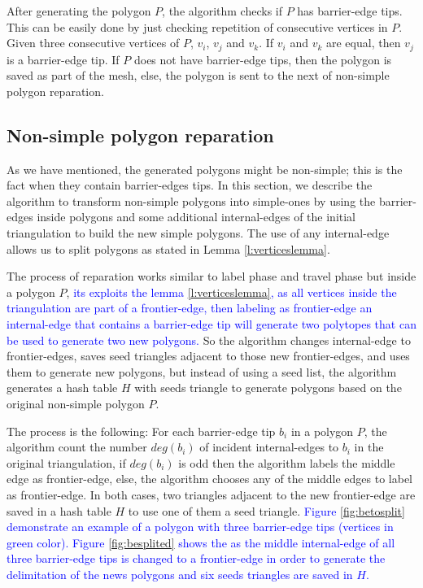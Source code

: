 After generating the polygon $P$, the algorithm checks if $P$ has barrier-edge tips. This can be easily done by just checking repetition of consecutive vertices in $P$. Given three consecutive vertices of $P$, $v_i$, $v_j$ and $v_k$. If $v_i$ and $v_k$ are equal, then $v_j$ is a barrier-edge tip. If $P$ does not have barrier-edge tips, then the polygon is saved as part of the mesh, else, the polygon is sent to the next of non-simple polygon reparation.




\subsection{Non-simple polygon reparation}
\label{subsec:nonsimplereparation}

As we have mentioned, the generated polygons might be non-simple; this is the fact when they contain barrier-edges tips. In this section, we describe the algorithm to transform non-simple polygons into simple-ones by using the barrier-edges inside polygons and some additional internal-edges of the initial triangulation to build the new simple polygons. The use of any internal-edge allows us to split polygons as stated in Lemma \ref{l:verticeslemma}.

The process of reparation works similar to label phase and travel phase but inside a polygon $P$, \textcolor{blue}{ its exploits the lemma \ref{l:verticeslemma}, as all vertices inside the triangulation are part of a frontier-edge, then labeling as frontier-edge an internal-edge that contains a barrier-edge tip will generate two polytopes that can be used to generate two new polygons.} So the algorithm changes internal-edge to frontier-edges, saves seed triangles adjacent to those new frontier-edges, and uses them to generate new polygons, but instead of using a seed list, the algorithm generates a hash table $H$ with seeds triangle to generate polygons based on the original non-simple polygon $P$. 

The process is the following: For each barrier-edge tip $b_i$ in a polygon $P$, the algorithm count the number $deg(b_i)$ of incident internal-edges to $b_i$ in the original triangulation, if $deg(b_i)$ is odd then the algorithm labels the middle edge as frontier-edge, else, the algorithm chooses any of the middle edges to label as frontier-edge. In both cases, two triangles adjacent to the new frontier-edge are saved in a hash table $H$ to use one of them a seed triangle. \textcolor{blue}{Figure \ref{fig:betosplit} demonstrate an example of a polygon with three barrier-edge tips (vertices in green color). Figure \ref{fig:besplited} shows the as the middle internal-edge of all three barrier-edge tips is changed to a frontier-edge in order to generate the delimitation of the news polygons and six seeds triangles are saved in $H$.}


